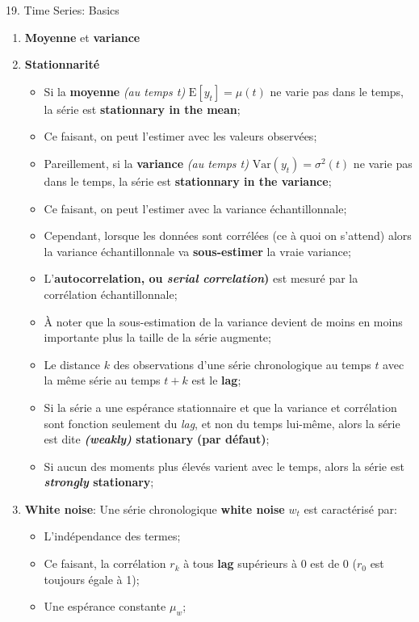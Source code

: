 \documentclass[12pt, titlepage, french]{report}
\begin{document}
\begin{CHPT_SUMM}[label = {timeseries19}]{19. Time Series: Basics}
\begin{enumerate}
\begin{itemize}
		\end{itemize} 
	\item	\textbf{Moyenne} et \textbf{variance}
	\item[]	\textbf{Stationnarité}
		\begin{itemize}
		\item	Si la \textbf{moyenne} \textit{(au temps t)} $\text{E}[y_{t}] = \mu(t)$ ne varie pas dans le temps, la série est \textbf{stationnary in the mean};
		\item[]	Ce faisant, on peut l'estimer avec les valeurs observées;
		\item	Pareillement, si la \textbf{variance} \textit{(au temps t)} $\text{Var}(y_{t}) = \sigma^{2}(t)$ ne varie pas dans le temps, la série est \textbf{stationnary in the variance};
		\item[]	Ce faisant, on peut l'estimer avec la variance échantillonnale;
		\item	Cependant, lorsque les données sont corrélées (ce à quoi on s'attend) alors la variance échantillonnale va \textbf{sous-estimer} la vraie variance;
		\item	L'\textbf{autocorrelation, ou \textit{serial correlation})} est mesuré par la corrélation échantillonnale;
		\item[]	À noter que la sous-estimation de la variance devient de moins en moins importante plus la taille de la série augmente;
		\item	Le distance $k$ des observations d'une série chronologique au temps $t$ avec la même série au temps $t + k$ est le \textbf{lag};
		\item	Si la série a une espérance stationnaire et que la variance et corrélation sont fonction seulement du \textit{lag}, et non du temps lui-même, alors la série est dite \textbf{\textit{(weakly)} stationary} \textbf{(par défaut)};
		\item	Si aucun des moments plus élevés varient avec le temps, alors la série est \textbf{\textit{strongly} stationary};
		\end{itemize}
	\item	\textbf{White noise}: Une série chronologique \textbf{white noise}  $w_{t}$ est caractérisé par:
	\begin{itemize}
		\item	L'indépendance des termes;
		\item[]	Ce faisant, la corrélation $r_{k}$ à tous \textbf{lag} supérieurs à 0 est de 0 ($r_{0}$ est toujours égale à 1);
		\item	Une espérance constante $\mu_w$;

\end{itemize}
\end{enumerate}
\end{CHPT_SUMM}
\end{document}
